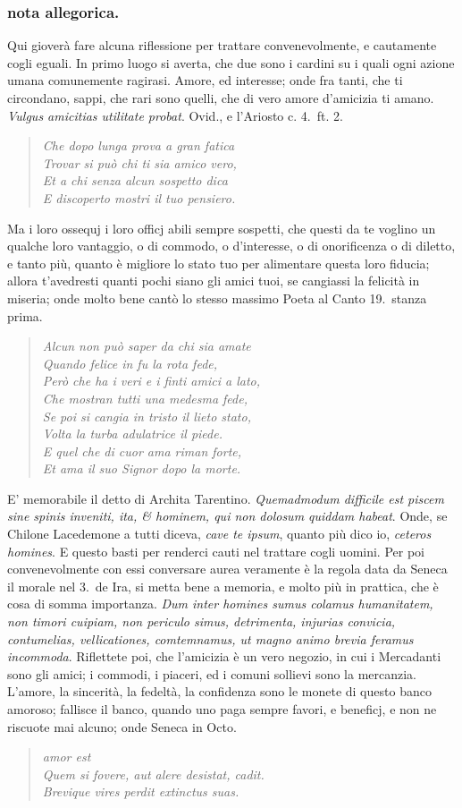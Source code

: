 \documentclass[11pt,a6paper]{article}
\newcommand{\literaryquote}[1]{%
\kern -6pt  \begin{verse}
    {\footnotesize \it #1}
  \end{verse}\kern -2pt%
}
\begin{document}
\subsubsection{nota allegorica.}
{\footnotesize
 Qui gioverà fare alcuna riflessione per trattare
convenevolmente, e cautamente cogli eguali. In
primo luogo si averta, che due sono i cardini su i
quali ogni azione umana comunemente ragirasi.
Amore, ed interesse; onde fra tanti, che ti
circondano, sappi, che rari sono quelli, che di vero
amore d'amicizia ti amano. \textit{Vulgus
 amicitias utilitate
probat}. Ovid., e l'Ariosto c. 4.\ ft. 2.
\literaryquote{
Che dopo lunga prova a gran fatica\\
Trovar si può chi ti sia amico vero,\\
Et a chi senza alcun sospetto dica\\
E discoperto mostri il tuo pensiero.}

Ma i loro ossequj i loro officj abili sempre sospetti,
che questi da te voglino un qualche loro vantaggio,
o di commodo, o d'interesse, o di onorificenza o
di diletto, e tanto più, quanto è migliore lo stato
tuo per alimentare questa loro fiducia; allora
t'avedresti quanti pochi siano gli amici tuoi, se
cangiassi
la felicità in miseria; onde molto bene cantò lo
stesso massimo Poeta al Canto 19.\ stanza prima.
\literaryquote{
Alcun non può saper da chi sia amate\\
Quando felice in fu la rota fede,\\
Però che ha i veri e i finti amici a lato,\\
Che mostran tutti una medesma fede, \\
Se poi si cangia in tristo il lieto stato, \\
Volta la turba adulatrice il piede.\\
E quel che di cuor ama riman forte, \\
Et ama il suo Signor dopo la morte.}

E' memorabile il detto di Archita Tarentino.
\textit{Quemadmodum difficile est piscem sine spinis
inveniti, ita, \& hominem, qui non dolosum quiddam
habeat}. Onde, se Chilone Lacedemone a tutti
diceva, \textit{cave te ipsum}, quanto più dico io, \textit{ceteros
homines}. E questo basti per renderci cauti nel trattare
cogli uomini. Per poi convenevolmente con essi
conversare aurea veramente è la regola data da
Seneca il morale nel 3.\ de Ira, si metta bene a
memoria, e molto più in prattica, che è cosa di somma
importanza. \textit{Dum inter homines sumus colamus
humanitatem, non timori cuipiam, non periculo
simus, detrimenta, injurias convicia, contumelias,
vellicationes, comtemnamus, ut magno animo brevia
feramus incommoda}. Riflettete poi, che l'amicizia
è un vero negozio, in cui i Mercadanti sono gli
amici; i commodi, i piaceri, ed i comuni sollievi
sono la mercanzia. L'amore, la sincerità, la fedeltà,
la confidenza sono le monete di questo banco amoroso;
fallisce il banco, quando uno paga sempre favori,
e beneficj, e non ne riscuote mai alcuno; onde
 Seneca in Octo.
\literaryquote{
{\hspace{14em} amor est}\\
Quem si fovere, aut alere desistat, cadit. \\
Brevique vires perdit extinctus suas.}

}
\end{document}
